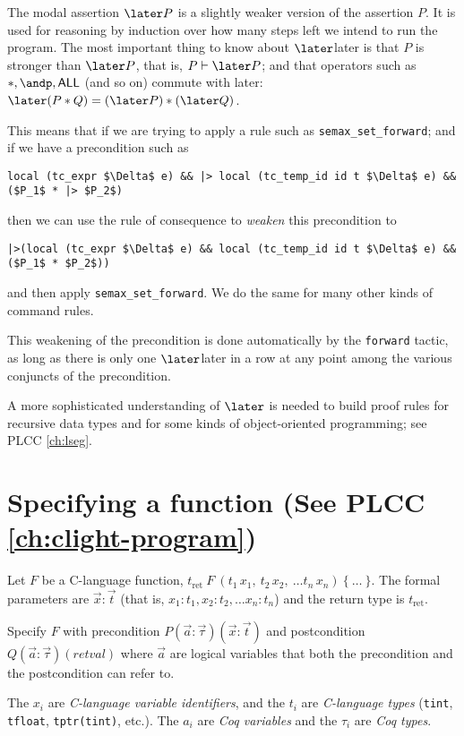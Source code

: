 \documentclass[12pt,fleqn,openany,oneside,showtrims]{memoir}
\newcommand{\ychapter}[2]{\chapter[#1]{#1 \hfill \normalsize #2}}
\begin{document}
The modal assertion $\later P$ is a slightly weaker version of the
assertion $P$.  It is used for reasoning by induction over how many
steps left we intend to run the program.  The most important
thing to know about $\later$later is that $P$ is stronger than
$\later P$, that is, $P \vdash \later P$; and that operators such
as $*, \andp, \mathsf{ALL}$ (and so on) commute with later:
$\later (P*Q)= (\later P) * (\later Q)$.

This means that if we are trying to apply a rule such as
\lstinline{semax_set_forward}; and if we
have a precondition such as
\begin{lstlisting}
local (tc_expr $\Delta$ e) && |> local (tc_temp_id id t $\Delta$ e) && ($P_1$ * |> $P_2$)
\end{lstlisting}
then we can use the rule of consequence to \emph{weaken}
this precondition to
\begin{lstlisting}
|>(local (tc_expr $\Delta$ e) && local (tc_temp_id id t $\Delta$ e) && ($P_1$ * $P_2$))
\end{lstlisting}
and then apply \lstinline{semax_set_forward}.  We do the same for many other kinds of command rules.

This weakening of the precondition is done automatically by the 
\lstinline{forward} tactic, as long as there is only one
$\later$later in a row at any point among the various conjuncts of
the precondition.

A more sophisticated understanding of $\later$ is needed to 
build proof rules for recursive data types and for 
some kinds of object-oriented programming; see PLCC \autoref{ch:lseg}.


\ychapter{Specifying a function}{(See PLCC \autoref{ch:clight-program})}

Let $F$ be a C-language function, $t_\mathrm{ret}~F~(t_1\, x_1,~t_2\, x_2,~\ldots t_n\, x_n)~\{~\ldots~\}$.
\linebreak
The formal parameters are
$\vec{x}:\vec{t}$ (that is, $x_1:t_1, x_2:t_2, \ldots
x_n:t_n$) and the return type is $t_\mathrm{ret}$.

Specify $F$ with precondition $P(\vec{a}:\vec{\tau})(\vec{x}:\vec{t})$
and postcondition
\linebreak $Q(\vec{a}:\vec{\tau})(\mathit{retval})$
where $\vec{a}$ are logical variables that both the 
precondition and the postcondition can refer to.

The $x_i$ are \emph{C-language variable identifiers},
and the $t_i$ are \emph{C-language types} 
(\lstinline{tint}, \lstinline{tfloat}, \lstinline{tptr(tint)}, 
etc.).
The $a_i$ are \emph{Coq variables} and the $\tau_i$ are \emph{Coq types}.
\end{document}
